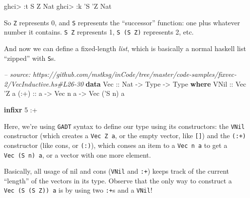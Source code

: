 \documentclass[]{article}
\newenvironment{Shaded}{}{}
\newcommand{\KeywordTok}[1]{\textcolor[rgb]{0.00,0.44,0.13}{\textbf{#1}}}
\newcommand{\DataTypeTok}[1]{\textcolor[rgb]{0.56,0.13,0.00}{#1}}
\newcommand{\DecValTok}[1]{\textcolor[rgb]{0.25,0.63,0.44}{#1}}
\newcommand{\CharTok}[1]{\textcolor[rgb]{0.25,0.44,0.63}{#1}}
\newcommand{\CommentTok}[1]{\textcolor[rgb]{0.38,0.63,0.69}{\textit{#1}}}
\newcommand{\OtherTok}[1]{\textcolor[rgb]{0.00,0.44,0.13}{#1}}
\newcommand{\FunctionTok}[1]{\textcolor[rgb]{0.02,0.16,0.49}{#1}}
\newcommand{\NormalTok}[1]{#1}
\begin{document}
\begin{Shaded}
\begin{Highlighting}[]
\NormalTok{ghci}\FunctionTok{>} \FunctionTok{:}\NormalTok{t }\DataTypeTok{S} \DataTypeTok{Z}
\DataTypeTok{Nat}
\NormalTok{ghci}\FunctionTok{>} \FunctionTok{:}\NormalTok{k }\CharTok{'S '}\DataTypeTok{Z}
\DataTypeTok{Nat}
\end{Highlighting}
\end{Shaded}

So \texttt{\textquotesingle{}Z} represents 0, and \texttt{\textquotesingle{}S}
represents the ``successor'' function: one plus whatever number it contains.
\texttt{\textquotesingle{}S\ \textquotesingle{}Z} represents 1,
\texttt{\textquotesingle{}S\ (\textquotesingle{}S\ \textquotesingle{}Z)}
represents 2, etc.

And now we can define a fixed-length \emph{list}, which is basically a normal
haskell list ``zipped'' with \texttt{S}s.

\begin{Shaded}
\begin{Highlighting}[]
\CommentTok{-- source: https://github.com/mstksg/inCode/tree/master/code-samples/fixvec-2/VecInductive.hs#L26-30}
\KeywordTok{data} \DataTypeTok{Vec}\OtherTok{ ::} \DataTypeTok{Nat} \OtherTok{->} \DataTypeTok{Type} \OtherTok{->} \DataTypeTok{Type} \KeywordTok{where}
    \DataTypeTok{VNil}\OtherTok{ ::} \DataTypeTok{Vec} \CharTok{'Z a}
\OtherTok{    (:+) ::}\NormalTok{ a }\OtherTok{->} \DataTypeTok{Vec}\NormalTok{ n a }\OtherTok{->} \DataTypeTok{Vec}\NormalTok{ (}\CharTok{'S n) a}


\KeywordTok{infixr} \DecValTok{5} \FunctionTok{:+}
\end{Highlighting}
\end{Shaded}

Here, we're using \texttt{GADT} syntax to define our type using its
constructors: the \texttt{VNil} constructor (which creates a
\texttt{Vec\ \textquotesingle{}Z\ a}, or the empty vector, like \texttt{{[}{]}})
and the \texttt{(:+)} constructor (like cons, or \texttt{(:)}), which conses an
item to a \texttt{Vec\ n\ a} to get a \texttt{Vec\ (\textquotesingle{}S\ n)\ a},
or a vector with one more element.

Basically, all usage of nil and cons (\texttt{VNil} and \texttt{:+}) keeps track
of the current ``length'' of the vectors in its type. Observe that the only way
to construct a
\texttt{Vec\ (\textquotesingle{}S\ (\textquotesingle{}S\ \textquotesingle{}Z))\ a}
is by using two \texttt{:+}s and a \texttt{VNil}!
\end{document}
